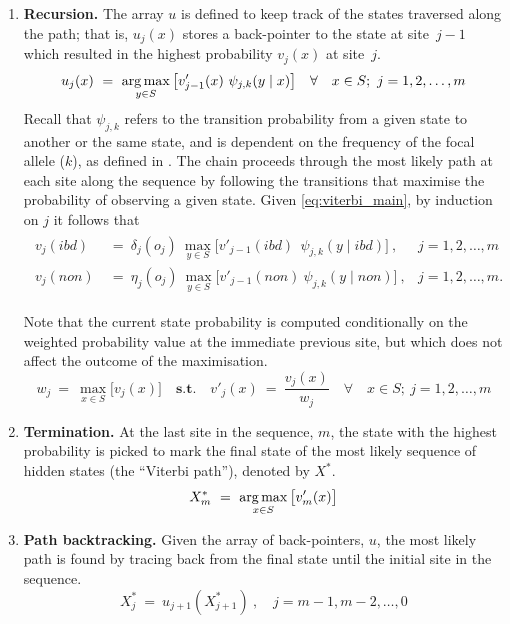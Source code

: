 \begin{enumerate}[label=\textbf{\arabic*.},leftmargin=*]
	\item \textbf{Recursion.} The array $u$ is defined to keep track of the states traversed along the path; that is, ${u_j(x)}$ stores a back-pointer to the state at site~$j-1$ which resulted in the highest probability ${v_j(x)}$ at site~$j$.
	\begin{equation}
		u_j(x) ~=~ \operatorname*{arg\,max}_{y \in S} \big[ v'_{j-1}(x) ~ \psi_{j,k}(y \mid x) \big] \quad \forall \quad x \in S; ~ j = 1, 2, \ldots, m
	\end{equation}
	Recall that ${\psi_{j,k}}$ refers to the transition probability from a given state to another or the same state, and is dependent on the frequency of the focal allele ($k$), as defined in .
	The chain proceeds through the most likely path at each site along the sequence by following the transitions that maximise the probability of observing a given state.
	Given \cref{eq:viterbi_main}, by induction on $j$ it follows that
	\begin{align}
	\begin{aligned}
		v_j(\textit{ibd})  & ~=~ \delta_j(o_j) ~ \max_{y \in S} \big[ v'_{j-1}(\textit{ibd}) ~ ~ \psi_{j,k}(y \mid \textit{ibd}) \big]\ , & j = 1, 2, \ldots, m\phantom{.} \\
		v_j(\textit{non})  & ~=~ \eta_j(o_j) ~ \max_{y \in S} \big[ v'_{j-1}(\textit{non}) ~ \psi_{j,k}(y \mid \textit{non}) \big]\ , & j = 1, 2, \ldots, m.
	\end{aligned}
	\end{align}

	Note that the current state probability is computed conditionally on the weighted probability value at the immediate previous site, but which does not affect the outcome of the maximisation.
	\begin{equation}
		w_j ~=~ \max_{x \in S} \big[ v_j(x) \big] \quad\textbf{s.t.}\quad
		v'_j(x) ~=~ \frac{v_j(x)}{w_j} \quad \forall \quad x \in S; ~ j = 1, 2, \ldots, m
	\end{equation}

	\item \textbf{Termination.} At the last site in the sequence, $m$, the state with the highest probability is picked to mark the final state of the most likely sequence of hidden states (\ie the ``Viterbi path''), denoted by ${X^\ast}$.
	\begin{equation}
		X^\ast_m ~=~ \operatorname*{arg\,max}_{x \in S} \big[ v'_{m}(x) \big]
	\end{equation}

	\item \textbf{Path backtracking.} Given the array of back-pointers, $u$, the most likely path is found by tracing back from the final state until the initial site in the sequence.
	\begin{equation}
		X^\ast_j ~=~ u_{j+1}\left(X^\ast_{j+1}\right)\ , \quad j = m-1, m-2, \ldots, 0
	\end{equation}
\end{enumerate}

